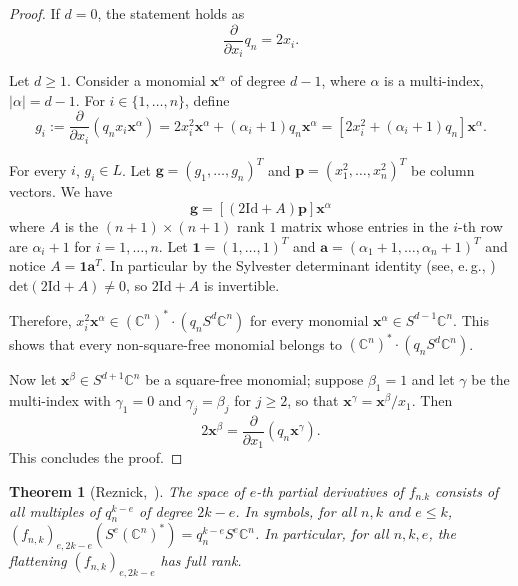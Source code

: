 \documentclass[11pt]{article}
\numberwithin{equation}{section}
\newtheorem{theorem}{Theorem}[section]
\theoremstyle{definition}
\theoremstyle{plain}
\newcommand{\eg}{e.\,g.}
\newcommand{\vvirg}{ , \dots , }
\newcommand{\bfa}{\mathbf{a}}
\newcommand{\bfg}{\mathbf{g}}
\newcommand{\bfp}{\mathbf{p}}
\newcommand{\bfx}{\mathbf{x}}
\newcommand{\Id}{\mathrm{Id}}
\renewcommand{\det}{\mathrm{det}}
\def\BC{\mathbb C}
\begin{document}
\begin{proof}
If $d = 0$, the statement holds as 
\[
\frac{\partial}{\partial x_i} q_n = 2x_i.
 \]

Let $d \geq 1$. Consider a monomial $\bfx ^\alpha$ of degree $d-1$, where $\alpha$ is a multi-index, $\vert \alpha \vert = d-1$. For   $i\in \{ 1\vvirg n\}$,  define 
\[
g_i := \frac{\partial}{\partial x_i}(q_n x_i \bfx^\alpha  ) = 2x_i^2 \bfx^\alpha    + (\alpha_i+1)q_n \bfx^\alpha  = \left[ 2x_i^2 + (\alpha_i+1)q_n \right] \bfx^\alpha.
\]

For every $i$, $g_i \in L$. Let $\bfg = (g_1 \vvirg g_n)^T$ and $\bfp = (x_1^2 \vvirg x_n^2)^T$ be column vectors. We have
\[
 \bfg =  \left[ (2\Id + A) \bfp \right] \bfx^\alpha
\]
where $A$ is the $(n+1) \times (n+1)$ rank $1$ matrix whose entries in the $i$-th row are $\alpha_i + 1$ for $i=1 \vvirg n$. Let $\mathbf{1} = (1 \vvirg 1 )^T$ and $\bfa = (\alpha_1+1 \vvirg \alpha_n+1)^T$ and notice $A = \mathbf{1} \bfa ^T$. In particular by the Sylvester determinant identity (see, \eg, \cite[Chap. 1, Prob. 3.1]{MR1277174}) $\det(2\Id+A) \neq 0$, so $2 \Id + A$ is invertible.

Therefore, $x_i^2 \bfx^\alpha \in (\BC^{n})^* \cdot \left( q_nS^d \BC^{n} \right)$ for every monomial $\bfx^\alpha \in S^{d-1}\BC^{n}$. This shows that every non-square-free monomial belongs to $(\BC^{n})^* \cdot (q_n S^d\BC^{n})$.

Now let $\bfx^\beta \in S^{d+1}\BC^{n}$ be a square-free monomial; suppose $\beta_1 = 1$ and let $\gamma$ be the multi-index with $\gamma_1 = 0$ and $\gamma_j = \beta_j$ for $j\geq 2$, so that $\bfx^\gamma = \bfx^\beta / x_1$. Then 
\[
2\bfx^\beta = \frac{\partial}{\partial x_1} (q_n \bfx^\gamma).
\]
This concludes the proof.
\end{proof}



\begin{theorem}[Reznick,~\cite{MR1096187}]\label{thm: flattenings of qk hit everything} 
The space of $e$-th partial derivatives  of $f_{n.k}$ consists of all multiples of $q_n^{k-e}$ of degree $2k-e$. In symbols, for all  $n,k$ and $e\leq k$,   $(f_{n,k})_{e,2k-e}(S^e (\BC^{n})^*)= q_n^{k-e} S^e \BC^{n}$. In particular, for all $n,k,e$, the flattening $(f_{n,k})_{e,2k-e}$ has full rank.
\end{theorem}
 
\end{document}
